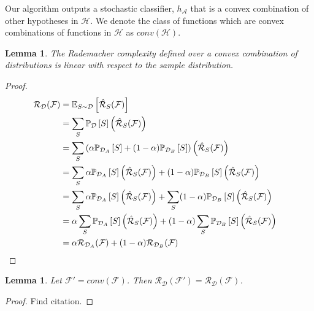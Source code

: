 \documentclass{article}
\newtheorem{lemma}[theorem]{Lemma}
\newcommand{\hyp}{\mathcal{H}}
\newcommand{\alg}{\mathcal{A}}
\newcommand{\dist}{\mathcal{D}}
\newcommand{\rade}{\mathcal{R}}
\newcommand{\fun}{\mathcal{F}}
\newcommand{\prob}[2]{\mathbb{P}_{#1}\left[{#2}\right]}
\newcommand{\expect}[2]{\mathbb{E}_{#1}\left[{#2}\right]}
\begin{document}
Our algorithm outputs a stochastic classifier, $h_{\alg}$ that is a convex combination of other hypotheses in $\hyp$. We denote the class of functions which are convex combinations of functions in $\hyp$ as $conv(\hyp)$. 


\begin{lemma}
The Rademacher complexity defined over a convex combination of distributions is linear with respect to the sample distribution.
\end{lemma}

\begin{proof}
\begin{align*}
\rade_{\dist}(\fun)
&= \expect{S\sim\dist}{\hat{\rade}_{S}(\fun)}
\\ &= \sum_{S}\prob{\dist}{S}\left(\hat{\rade}_{S}(\fun)\right)
\\ &= \sum_{S}\left(\alpha\prob{\dist_A}{S}+(1-\alpha)\prob{\dist_B}{S}\right)\left(\hat{\rade}_{S}(\fun)\right)
\\ &= \sum_{S}\alpha\prob{\dist_A}{S}\left(\hat{\rade}_{S}(\fun)\right)+(1-\alpha)\prob{\dist_B}{S}\left(\hat{\rade}_{S}(\fun)\right)
\\ &= \sum_{S}\alpha\prob{\dist_A}{S}\left(\hat{\rade}_{S}(\fun)\right)+ \sum_{S}(1-\alpha)\prob{\dist_B}{S}\left(\hat{\rade}_{S}(\fun)\right)
\\ &= \alpha\sum_{S}\prob{\dist_A}{S}\left(\hat{\rade}_{S}(\fun)\right)+ (1-\alpha)\sum_{S}\prob{\dist_B}{S}\left(\hat{\rade}_{S}(\fun)\right)
\\ &= \alpha\rade_{\dist_A}(\fun) + (1-\alpha)\rade_{\dist_B}(\fun)
&\qedhere
\end{align*}
\end{proof}

\begin{lemma}
Let $\fun' = conv(\fun)$. Then $\rade_{\dist}(\fun') = \rade_{\dist}(\fun)$.
\end{lemma}
\begin{proof}
Find citation.
\end{proof}
\end{document}
